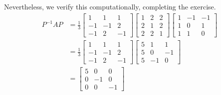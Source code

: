 \documentclass[10pt]{article}
\begin{document}
        Nevertheless, we verify this computationally, completing the exercise.
        \begin{align*}
                P^{-1}AP &= \frac{1}{3} \begin{bmatrix}
                        1 & 1 & 1 \\ -1 & -1 & 2 \\ -1 & 2 & -1
                \end{bmatrix}
                \begin{bmatrix}
                        1 & 2 & 2 \\ 2 & 1 & 2 \\ 2 & 2 & 1
                \end{bmatrix}
                \begin{bmatrix}
                        1 & -1 & -1 \\ 1 & 0 & 1 \\ 1 & 1 & 0
                \end{bmatrix} \\
                &= \frac{1}{3} \begin{bmatrix}
                        1 & 1 & 1 \\ -1 & -1 & 2 \\ -1 & 2 & -1
                \end{bmatrix}
                \begin{bmatrix}
                        5 & 1 & 1 \\ 5 & 0 & -1 \\ 5 & -1 & 0
                \end{bmatrix} \\
                &= \begin{bmatrix}
                        5 & 0 & 0 \\ 0 & -1 & 0 \\ 0 & 0 & -1
                \end{bmatrix}
        \end{align*}
\end{document}
